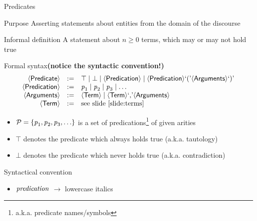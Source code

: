 \documentclass[presentation]{beamer}\mode<presentation>{\usetheme{AMSBolognaFC}}
\begin{document}
\begin{frame}[allowframebreaks]{Predicates}
    \begin{block}{Purpose}\centering
        Asserting statements about entities from the \alert{domain of the discourse}
    \end{block}
    \begin{block}{Informal definition}
        A \alert{statement} about $n\geq 0$ \alert{terms}, which may or may not hold true
    \end{block}
    \begin{alertblock}{Formal syntax\hfill\textbf{\footnotesize(notice the syntactic convention!)}}\label{slide:predicate}
        $$\begin{array}{rcl}
            \mathsf{\left\langle Predicate\right\rangle} & := & \top \mid \bot \mid \mathsf{\left\langle Predication\right\rangle} \mid \mathsf{\left\langle Predication\right\rangle} \text{`}\mathit{(}\text{'} \mathsf{\left\langle Arguments\right\rangle} \text{`}\mathit{)}\text{'}
            \\
            \mathsf{\left\langle Predication\right\rangle} & := & \text{\textit{p}}_1 \mid \text{\textit{p}}_2 \mid \text{\textit{p}}_3 \mid \ldots
            \\
            \mathsf{\left\langle Arguments\right\rangle} & := & \mathsf{\left\langle Term\right\rangle} \mid \mathsf{\left\langle Term\right\rangle} \text{`}\mathit{,}\text{'} \mathsf{\left\langle Arguments\right\rangle}
            \\
            \mathsf{\left\langle Term\right\rangle} & := & \text{see slide \ref{slide:terms}}
        \end{array}$$
        \begin{itemize}
            \item $\mathcal{P} = \{ \text{\textit{p}}_1, \text{\textit{p}}_2, \text{\textit{p}}_3, \ldots \}$ is a set of \alert{predications}\footnote{a.k.a. predicate names/symbols} of given \alert{arities}
            \item \alert{$\top$} denotes the predicate which \alert{always} holds true (a.k.a. \alert{tautology})
            \item \alert{$\bot$} denotes the predicate which \alert{never} holds true (a.k.a. \alert{contradiction})
        \end{itemize}
    \end{alertblock}
    \begin{block}{Syntactical convention}
        \begin{itemize}
            \item $\text{\textit{predication}}$ $\rightarrow$ lowercase italics
        \end{itemize}
    \end{block}
\end{frame}
\end{document}

